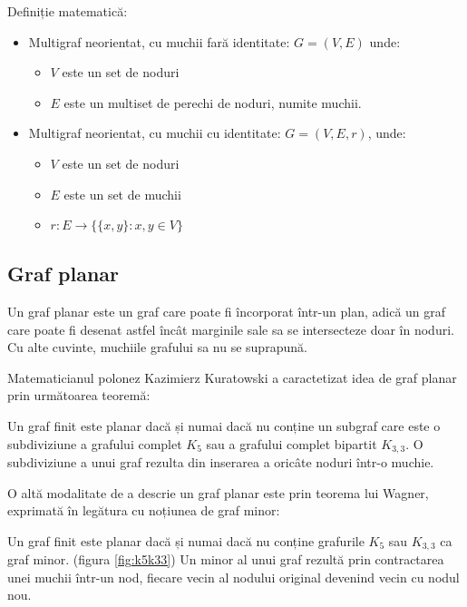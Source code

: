 Definiție matematică:\newline

\begin{itemize}
\item Multigraf neorientat, cu muchii fară identitate: 
\(G=(V,E)\) unde:
\begin{itemize}
    \item \(V\) este un set de noduri 
    \item \(E\) este un multiset de perechi de noduri, numite muchii.
\end{itemize}

    
\item Multigraf neorientat, cu muchii cu identitate:
\(G=(V,E,r)\), unde:
\begin{itemize}
    \item \(V\) este un set de noduri
    \item \(E\) este un set de muchii
    \item \(r : E → \{\{x,y\} : x, y \in V\}\)
\end{itemize}

\end{itemize}

\subsection{Graf planar}

Un graf planar este un graf care poate fi încorporat într-un plan, adică un graf care poate fi desenat astfel încât 
marginile sale sa se intersecteze doar în noduri. Cu alte cuvinte, muchiile grafului sa nu se suprapună. \cite{graf4}\newline

Matematicianul polonez Kazimierz Kuratowski a caractetizat idea de graf planar prin următoarea teoremă:\newline

Un graf finit este planar dacă și numai dacă nu conține un subgraf care este o subdiviziune a grafului complet \(K_5\) sau a grafului complet bipartit \(K_{3,3}\).
O subdiviziune a unui graf rezulta din inserarea a oricâte noduri într-o muchie.\newline

O altă modalitate de a descrie un graf planar este prin teorema lui Wagner, exprimată în legătura cu noțiunea de graf minor:\newline
 
Un graf finit este planar dacă și numai dacă nu conține grafurile \(K_5\) sau \(K_{3,3}\) ca graf minor. (figura \ref{fig:k5k33})
Un minor al unui graf rezultă prin contractarea unei muchii într-un nod, fiecare vecin al nodului original devenind vecin cu nodul nou.\newline

